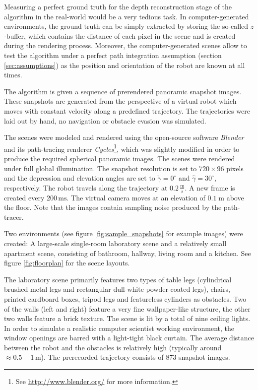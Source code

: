 Measuring a perfect ground truth for the depth reconstruction stage of the algorithm in the real-world would be a very tedious task. In computer-generated environments, the ground truth can be simply extracted by storing the so-called $z$-buffer, which contains the distance of each pixel in the scene and is created during the rendering process. Moreover, the computer-generated scenes allow to test the algorithm under a perfect path integration assumption (section \ref{sec:assumptions}) as the position and orientation of the robot are known at all times.

The algorithm is given a sequence of prerendered panoramic snapshot images. These snapshots are generated from the perspective of a virtual robot which moves with constant velocity along a predefined trajectory. The trajectories were laid out by hand, no navigation or obstacle evasion was simulated.

The scenes were modeled and rendered using the open-source software \textit{Blender} and its path-tracing renderer \textit{Cycles}\footnote{See \url{http://www.blender.org/} for more information.}, which was slightly modified in order to produce the required spherical panoramic images. The scenes were rendered under full global illumination. The snapshot resolution is set to $720 \times 96$ pixels and the depression and elevation angles are set to $\check \gamma = 0^\circ$ and $\hat \gamma = 30^\circ$, respectively. The robot travels along the trajectory at $0.2 \, \frac{\mathrm{m}}{\mathrm{s}}$. A new frame is created every $200 \, \mathrm{ms}$. The virtual camera moves at an elevation of $0.1 \; \mathrm{m}$ above the floor. Note that the images contain sampling noise produced by the path-tracer.

Two environments (see figure \ref{fig:sample_snapshots} for example images) were created: A large-scale single-room laboratory scene and a relatively small apartment scene, consisting of bathroom, hallway, living room and a kitchen. See figure \ref{fig:floorplan} for the scene layouts. 

The laboratory scene primarily features two types of table legs (cylindrical brushed metal legs and rectangular dull-white powder-coated legs), chairs, printed cardboard boxes, tripod legs and featureless cylinders as obstacles. Two of the walls (left and right) feature a very fine wallpaper-like structure, the other two walls feature a brick texture. The scene is lit by a total of nine ceiling lights. In order to simulate a realistic computer scientist working environment, the window openings are barred with a light-tight black curtain. The average distance between the robot and the obstacles is relatively high (typically around $\approx 0.5 - 1 \, \mathrm{m}$). The prerecorded trajectory consists of $873$ snapshot images.

